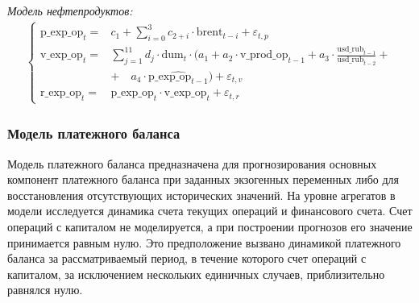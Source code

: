 \documentclass[a4paper, 14pt]{extarticle}
\newcommand{\lsum}{\sum\limits}
\begin{document}
\vspace{5mm}

\textit{Модель нефтепродуктов:}
\begin{align*} 
	\begin{cases}
		\text{p\_exp\_op}_t =&c_1 + \lsum_{i = 0}^{3}c_{2 + i} \cdot \text{brent}_{t-i} + \varepsilon_{t,p} \\
		\text{v\_exp\_op}_t =&\lsum_{j = 1}^{11} d_j \cdot \text{dum}_t \cdot (a_1 + a_2 \cdot \text{v\_prod\_op}_{t-1} + a_3 \cdot \frac{\text{usd\_rub}_{t-1}}{\text{usd\_rub}_{t-2}} + \\  
		&+ \quad a_4 \cdot \widehat{ \text{p\_exp\_op}_{t-1}}) + \varepsilon_{t,v} \\
		\text{r\_exp\_op}_t =&\text{p\_exp\_op}_t \cdot \text{v\_exp\_op}_t + \varepsilon_{t,r}
	\end{cases}
\end{align*}


\subsubsection{Модель платежного баланса}

Модель платежного баланса предназначена для прогнозирования основных компонент платежного баланса при заданных экзогенных переменных либо для восстановления отсутствующих исторических значений.
На уровне агрегатов в модели исследуется динамика счета текущих операций и финансового счета.
Счет операций с капиталом не моделируется, а при построении прогнозов его значение принимается равным нулю.
Это предположение вызвано динамикой платежного баланса за рассматриваемый период, в течение которого счет операций с капиталом, за исключением нескольких единичных случаев, приблизительно равнялся нулю.
\end{document}
